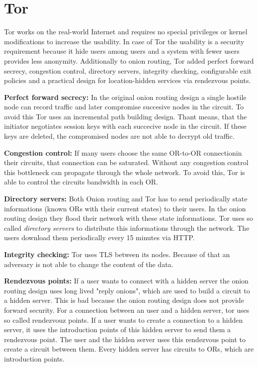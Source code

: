 \section{Tor}
Tor works on the real-world Internet and requires no special privileges or kernel modifications to increase the usability. In case of Tor the usability is a security requirement because it hide users among users and a system with fewer users provides less anonymity.
Additionally to onion routing, Tor added perfect forward secrecy, congestion control, directory servers, integrity checking, configurable exit policies and a practical design for location-hidden services via rendezvous points.

\textbf{Perfect forward secrecy:} In the original onion routing design a single hostile node can record traffic and later compromise succesive nodes in the circuit. To avoid this Tor uses an incremental path building design. Thant means, that the initiator negotiates session keys with each succecive node in the circuit. If these keys are deleted, the compromised nodes are not able to decrypt old traffic.

\textbf{Congestion control:} If many users choose the same OR-to-OR connectionin their circuits, that connection can be saturated. Without any congestion control this bottleneck can propagate through the whole network. To avoid this, Tor is able to control the circuits bandwidth in each OR. 

\textbf{Directory servers:} Both Onion routing and Tor has to send periodically state informations (known ORs with their current states) to their users. In the onion routing design they flood their network with these state informations. Tor uses so called \textit{directory servers} to distribute this informations through the network. The users download them periodically every 15 minutes via HTTP.

\textbf{Integrity checking:} Tor uses TLS between its nodes. Because of that an adversary is not able to change the content of the data.

\textbf{Rendezvous points:} If a user wants to connect with a hidden server the onion routing design uses long lived "reply onions", which are used to build a circuit to a hidden server. This is bad because the onion routing design does not provide forward security. For a connection between an user and a hidden server, tor uses so called rendezvouz points. If a user wants to create a connection to a hidden server, it uses the introduction points of this hidden server to send them a rendezvous point. The user and the hidden server uses this rendezvous point to create a circuit between them. Every hidden server has circuits to ORs, which are introduction points.\cite{rendezvousPoints}